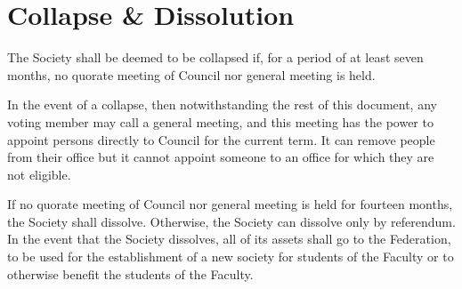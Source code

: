 \section{Collapse \& Dissolution}
The Society shall be deemed to be collapsed if, for a period of at least seven
months, no quorate meeting of Council nor general meeting is held.

In the event of a collapse, then notwithstanding the rest of this document, any
voting member may call a general meeting, and this meeting has the power to
appoint persons directly to Council for the current term. It can remove people
from their office but it cannot appoint someone to an office for which they are
not eligible.

If no quorate meeting of Council nor general meeting is held for fourteen months, the
Society shall dissolve. Otherwise, the Society can dissolve only by referendum.
In the event that the Society dissolves, all of its assets shall go to the
Federation, to be used for the establishment of a new society for students of
the Faculty or to otherwise benefit the students of the Faculty.